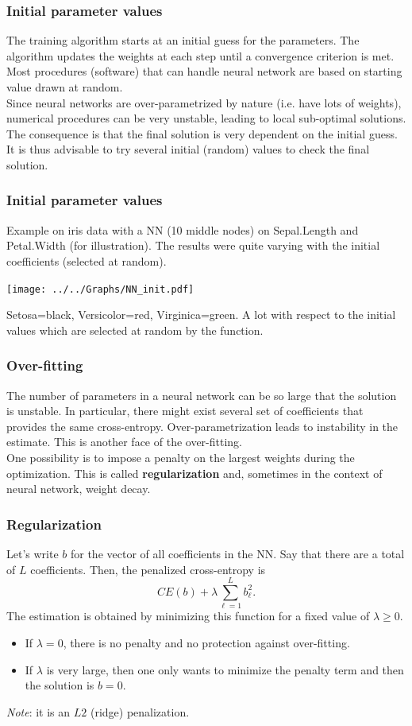 \begin{frame}
\frametitle{Initial parameter values}
The training algorithm starts at an initial guess for the parameters. The algorithm updates the weights at each step until a convergence criterion is met.\\ 
\vspace{0.3cm}
Most procedures (software) that can handle neural network are based on starting value drawn at random.\\
\vspace{0.3cm}
Since neural networks are over-parametrized by nature (i.e. have lots of weights), numerical procedures can be very unstable, leading to local sub-optimal solutions. The consequence is that the final solution is very dependent on the initial guess. \\
\vspace{0.3cm}
It is thus advisable to try several initial (random) values to check the final solution.
\end{frame}
\begin{frame}
\frametitle{Initial parameter values}
\small Example on iris data with a NN (10 middle nodes) on Sepal.Length and Petal.Width (for illustration). The results were quite varying with the initial coefficients (selected at random).
\begin{center}
\texttt{[image: ../../Graphs/NN\_init.pdf]}
\end{center} 
Setosa=black, Versicolor=red, Virginica=green. A lot with respect to the initial values which are selected at random by the function.
\end{frame}
\begin{frame}
\frametitle{Over-fitting}
The number of parameters in a neural network can be so large that the solution is unstable. In particular, there might exist several set of coefficients that provides the same cross-entropy. Over-parametrization leads to instability in the estimate. This is another face of the over-fitting. \\
\vspace{0.3cm}
One possibility is to impose a penalty on the largest weights during the optimization. This is called {\bf regularization} and, sometimes in the context of neural network, weight decay.
\end{frame}
\begin{frame}
\frametitle{Regularization}
Let's write $b$ for the vector of all coefficients in the NN. Say that there are a total of $L$ coefficients. Then, the penalized cross-entropy is
$$
CE(b) + \lambda \sum_{\ell=1}^L b_{\ell}^2.
$$ 
The estimation is obtained by minimizing this function for a fixed value of $\lambda\geq 0$. 
\begin{itemize}
\item If $\lambda=0$, there is no penalty and no protection against over-fitting.
\item If $\lambda$ is very large, then one only wants to minimize the penalty term and then the solution is $b=0$.
\end{itemize}
{\it Note}: it is an $L2$ (ridge) penalization.
\end{frame}
